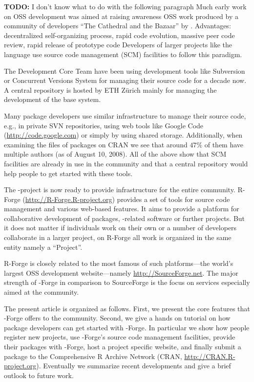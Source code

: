 \textbf{TODO: } I don't know what to do with the following paragraph
Much early work on OSS development was aimed at raising awareness  OSS
work produced by a community of developers ``The Cathedral and the
Bazaar'' by \cite{forge:Raymond:1999}.
Advantages:
decentralized self-organizing process, rapid code evolution, massive
peer code review, rapid release of prototype code
Developers of larger projects like the language \R{} use source code
management (SCM) facilities to follow this paradigm.

The \R{} Development Core Team have been using
development tools like Subversion \citep[SVN,
see][]{forge:Pilato+Collins-Sussman+Fitzpatrick:2004} or  
Concurrent Versions System \citep[CVS, see][]{forge:Cederqvist:2006}
for managing their source code for a decade now.  
A central repository is hosted by ETH Z\"urich mainly for
managing the development of the base \R{} system. 

Many package developers use similar infrastructure to manage their
source code, e.g., in private SVN repositories, using web tools like
Google Code (\url{http://code.google.com}) or simply by using shared
storage. Additionally, when examining the  files of
packages on CRAN we see that around $47\%$ of them have multiple
authors (as of August 10, 2008). All of the above show that SCM
facilities are already in use in the \R{} community and that a central
repository would help people to get started with these tools.

The \R{}-project is now ready to provide infrastructure
for the entire \R{} community. 
R-Forge (\url{http://R-Forge.R-project.org}) provides a set of tools
for source code management and various web-based
features. It aims to provide a platform for collaborative development of
\R{} packages, \R{}-related software or further projects. But it does not
matter if individuals work on their own or a number of developers
collaborate in a larger project, on R-Forge all work is organized in
the same entity namely a ``Project''.

R-Forge is closely related to the most famous of such platforms---the
world's largest OSS development website---namely
\url{http://SourceForge.net}. The major strength of \R{}-Forge in
comparison to SourceForge is the focus on services especially aimed at
the \R{} community.

The present article is organized as follows. First, we present the core
features that \R{}-Forge offers to the \R{} community. Second, we
give a hands on tutorial on how package developers can get started with 
\R{}-Forge. In particular we show how people register new projects,
use \R{}-Forge's source code management facilities, provide their 
packages with \R{}-Forge, host a project specific website, and
finally submit a package to the Comprehensive R Archive Network (CRAN,
\url{http://CRAN.R-project.org}).
Eventually we summarize recent developments and give a brief outlook
to future work.


